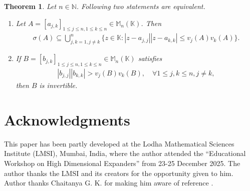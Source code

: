 \documentclass{amsart}
\newtheorem{theorem}{Theorem}[section]
\begin{document}
\begin{theorem} \label{E2}
	Let $n \in \mathbb{N}$.  Following two statements are equivalent. 
	\begin{enumerate}[\upshape(i)]
		\item Let $A=[a_{j,k}]_{1\leq j\leq n, 1\leq k \leq n}\in  \mathbb{M}_n(\mathbb{K})$. Then 
		\begin{align*}
			\sigma(A)\subseteq \bigcup_{j,k=1, j \neq k}^n\{z \in \mathbb{K}: |z-a_{j, j}||z-a_{k,k}|\leq v_j(A)v_k(A)\}.
		\end{align*}
		\item 	If  $B=[b_{j,k}]_{1\leq j\leq n, 1\leq k \leq n}\in  \mathbb{M}_n(\mathbb{K})$ satisfies
		\begin{align*}
			|b_{j,j}||b_{k,k}|>	v_j(B)v_k(B), \quad \forall 1\leq j, k \leq n, j \neq k,
		\end{align*}
		then $B$ is invertible. 
	\end{enumerate}
\end{theorem}


\section{Acknowledgments}
This paper has been partly developed at the Lodha Mathematical Sciences Institute (LMSI), Mumbai, India,  where the author attended the ``Educational Workshop on High Dimensional Expanders'' from 23-25 December 2025. The author thanks the LMSI and its creators for the opportunity given to him. Author  thanks Chaitanya G. K. for making him aware of  reference \cite{LILI}. 

 
 
 
\end{document}
